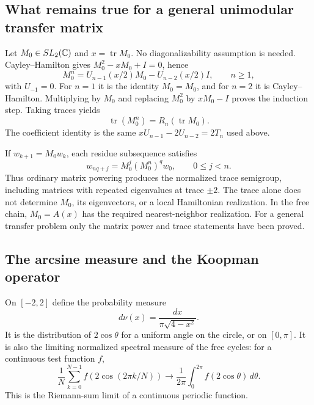 \subsection{What remains true for a general unimodular transfer matrix}

Let $M_0\in SL_2(\mathbb C)$ and $x=\operatorname{tr}M_0$. No
diagonalizability assumption is needed. Cayley--Hamilton gives
$M_0^2-xM_0+I=0$, hence
\begin{equation}
 M_0^n=U_{n-1}(x/2)M_0-U_{n-2}(x/2)I,\qquad n\geq1,
 \label{a-spectral-sl2-power}
\end{equation}
with $U_{-1}=0$. For $n=1$ it is the identity $M_0=M_0$, and for
$n=2$ it is Cayley--Hamilton. Multiplying by $M_0$ and replacing
$M_0^2$ by $xM_0-I$ proves the induction step. Taking traces yields
\begin{equation}
 \operatorname{tr}(M_0^n)=R_n(\operatorname{tr}M_0).
 \label{a-spectral-sl2-trace}
\end{equation}
The coefficient identity is the same
$xU_{n-1}-2U_{n-2}=2T_n$ used above.

If $w_{k+1}=M_0w_k$, each residue subsequence satisfies
\[
 w_{nq+j}=M_0^j(M_0^n)^q w_0,\qquad 0\leq j<n.
\]
Thus ordinary matrix powering produces the normalized trace semigroup,
including matrices with repeated eigenvalues at trace $\pm2$.
The trace alone does not determine $M_0$, its eigenvectors, or a
local Hamiltonian realization. In the free chain, $M_0=A(x)$ has
the required nearest-neighbor realization. For a general transfer
problem only the matrix power and trace statements have been proved.

\subsection{The arcsine measure and the Koopman operator}

On $[-2,2]$ define the probability measure
\begin{equation}
 d\nu(x)=\frac{dx}{\pi\sqrt{4-x^2}}.
 \label{a-spectral-arcsine-measure}
\end{equation}
It is the distribution of $2\cos\theta$ for a uniform angle on the
circle, or on $[0,\pi]$. It is also the limiting normalized spectral
measure of the free cycles: for a continuous test function $f$,
\[
 \frac1N\sum_{k=0}^{N-1}f(2\cos(2\pi k/N))
 \longrightarrow\frac1{2\pi}\int_0^{2\pi}f(2\cos\theta)\,d\theta.
\]
This is the Riemann-sum limit of a continuous periodic function.

